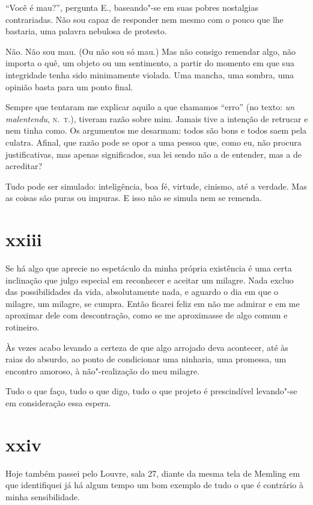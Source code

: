 ``Você é mau?'', pergunta E., baseando"-se em suas pobres nostalgias
contrariadas. Não sou capaz de responder nem mesmo com o pouco que
lhe bastaria, uma palavra nebulosa de protesto.

Não. Não sou mau. (Ou não sou só mau.) Mas não consigo remendar algo,
não importa o quê, um objeto ou um sentimento, a partir do momento em
que sua integridade tenha sido minimamente violada. Uma mancha, uma
sombra, uma opinião basta para um ponto final.

Sempre que tentaram me explicar aquilo a que chamamos ``erro'' (no
texto: \emph{un malentendu}, \textsc{n.~t.}), tiveram razão sobre mim. Jamais tive
a intenção de retrucar e nem tinha como. Os argumentos me desarmam:
todos são bons e todos saem pela culatra. Afinal, que razão pode se opor
a uma pessoa que, como eu, não procura justificativas, mas apenas
significados, sua lei sendo não a de entender, mas a de acreditar?

Tudo pode ser simulado: inteligência, boa fé, virtude, cinismo, até a
verdade. Mas as coisas são puras ou impuras. E isso não se simula nem
se remenda.

\section{xxiii}

Se há algo que aprecie no espetáculo da minha própria existência é
uma certa inclinação que julgo especial em reconhecer e aceitar um
milagre. Nada excluo das possibilidades da vida, absolutamente nada, e
aguardo o dia em que o milagre, um milagre, se cumpra. Então ficarei
feliz em não me admirar e em me aproximar dele com descontração, como se
me aproximasse de algo comum e rotineiro.

Às vezes acabo levando a certeza de que algo arrojado deva
acontecer, até às raias do absurdo, ao ponto de condicionar uma
ninharia, uma promessa, um encontro amoroso, à não"-realização do meu
milagre.

Tudo o que faço, tudo o que digo, tudo o que projeto é
prescindível levando"-se em consideração essa espera.

\section{xxiv}

Hoje também passei pelo Louvre, sala 27, diante da mesma tela de
Memling em que identifiquei já há algum tempo um bom exemplo de tudo o
que é contrário à minha sensibilidade.

